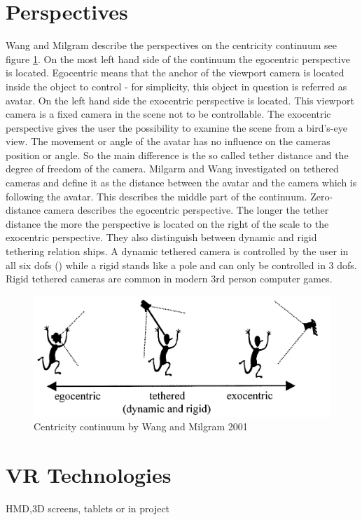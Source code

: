 \section{Perspectives}
\markAoneIndependent
Wang and Milgram \cite{Wang2001} describe the perspectives on the centricity continuum see figure \ref{fig:ego-exo-cont}. On the most left hand side of the continuum the egocentric perspective is located. Egocentric means that the anchor of the viewport camera is located inside the object to control - for simplicity, this object in question is referred as avatar. On the left hand side the exocentric perspective is located. This viewport camera is a fixed camera in the scene not to be controllable. The exocentric perspective gives the user the possibility to examine the scene from a bird's-eye view. The movement or angle of the avatar has no influence on the cameras position or angle. So the main difference is the so called tether distance and the degree of freedom of the camera. Milgarm and Wang investigated on tethered cameras and define it as the distance between the avatar and the camera which is following the avatar. This describes the middle part of the continuum. Zero-distance camera describes the egocentric perspective. The longer the tether distance the more the perspective is located on the right of the scale to the exocentric perspective. They also distinguish between dynamic and rigid tethering relation ships. A dynamic tethered camera is controlled by the user in all six dofs (\todo) while a rigid stands like a pole and can only be controlled in 3 dofs. Rigid tethered cameras are common in modern 3rd person computer games.
\begin{figure}
	\centering
		\includegraphics[width=1.0\textwidth]{img/ego_exo_continuum_bigger.PNG}
	\caption{Centricity continuum by Wang and Milgram 2001 \cite{Wang2001}}
	\label{fig:ego-exo-cont}
\end{figure}
\markAsixPerspective
\section{VR Technologies}
HMD,3D screens, tablets or in project

